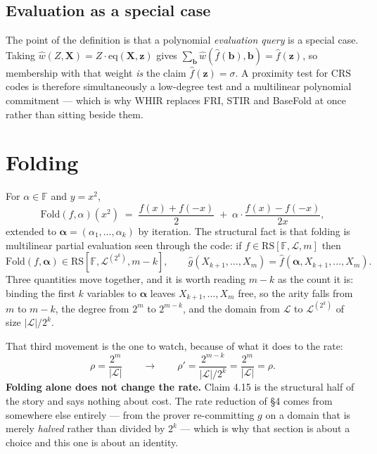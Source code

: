 \documentclass[11pt,a4paper]{article}
\newcommand{\eqp}{\mathrm{eq}}
\newcommand{\Fold}{\mathrm{Fold}}
\newcommand{\RS}{\mathrm{RS}}
\newcommand{\CRS}{\mathrm{CRS}}
\begin{document}
\subsection*{Evaluation as a special case}

The point of the definition is that a polynomial \emph{evaluation query} is a special case. Taking
$\hat w(Z,\boldsymbol X)=Z\cdot\eqp(\boldsymbol X,\boldsymbol z)$ gives
$\sum_{\boldsymbol b}\hat w(\hat f(\boldsymbol b),\boldsymbol b)=\hat f(\boldsymbol z)$, so
membership with that weight \emph{is} the claim $\hat f(\boldsymbol z)=\sigma$. A proximity test for
$\CRS$ codes is therefore simultaneously a low-degree test and a multilinear polynomial commitment
--- which is why WHIR replaces FRI, STIR and BaseFold at once rather than sitting beside them.

\section{Folding}

For $\alpha\in\mathbb{F}$ and $y=x^{2}$,
\[
  \Fold(f,\alpha)(x^{2}) \;=\; \frac{f(x)+f(-x)}{2}
  \;+\; \alpha\cdot\frac{f(x)-f(-x)}{2x},
\]
extended to $\boldsymbol\alpha=(\alpha_{1},\dots,\alpha_{k})$ by iteration. The structural fact is
that folding is multilinear partial evaluation seen through the code: if
$f\in\RS[\mathbb{F},\mathcal{L},m]$ then
\[
  \Fold(f,\boldsymbol\alpha)\in\RS[\mathbb{F},\mathcal{L}^{(2^{k})},m-k],
  \qquad
  \hat g(X_{k+1},\dots,X_{m})=\hat f(\boldsymbol\alpha,X_{k+1},\dots,X_{m}).
  \tag{Claim 4.15}
\]
Three quantities move together, and it is worth reading $m-k$ as the count it is: binding the first
$k$ variables to $\boldsymbol\alpha$ leaves $X_{k+1},\dots,X_{m}$ free, so the arity falls from $m$
to $m-k$, the degree from $2^{m}$ to $2^{m-k}$, and the domain from $\mathcal{L}$ to
$\mathcal{L}^{(2^{k})}$ of size $|\mathcal{L}|/2^{k}$.

That third movement is the one to watch, because of what it does to the rate:
\[
  \rho=\frac{2^{m}}{|\mathcal{L}|}
  \qquad\longrightarrow\qquad
  \rho'=\frac{2^{m-k}}{|\mathcal{L}|/2^{k}}=\frac{2^{m}}{|\mathcal{L}|}=\rho .
\]
\textbf{Folding alone does not change the rate.} Claim 4.15 is the structural half of the story and
says nothing about cost. The rate reduction of \S4 comes from somewhere else entirely --- from the
prover re-committing $g$ on a domain that is merely \emph{halved} rather than divided by $2^{k}$ ---
which is why that section is about a choice and this one is about an identity.
\end{document}
